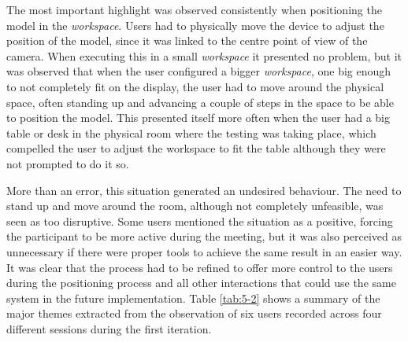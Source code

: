 The most important highlight was observed consistently when positioning the model in the \emph{workspace}. Users had to physically move the device to adjust the position of the
model, since it was linked to the centre point of view of the camera. When executing this in a small \emph{workspace} it presented no problem, but it was observed that when the
user configured a bigger \emph{workspace}, one big enough to not completely fit on the display, the user had to move around the physical space, often standing up and advancing a
couple of steps in the space to be able to position the model. This presented itself more often when the user had a big table or desk in the physical room where the testing was
taking place, which compelled the user to adjust the workspace to fit the table although they were not prompted to do it so.

More than an error, this situation generated an undesired behaviour. The need to stand up and move around the room, although not completely unfeasible, was seen as too
disruptive. Some users mentioned the situation as a positive, forcing the participant to be more active during the meeting, but it was also perceived as unnecessary if
there were proper tools to achieve the same result in an easier way. It was clear that the process had to be refined to offer more control to the users during the
positioning process and all other interactions that could use the same system in the future implementation. Table \ref{tab:5-2} shows a summary of the major themes extracted
from the observation of six users recorded across four different sessions during the first iteration.

